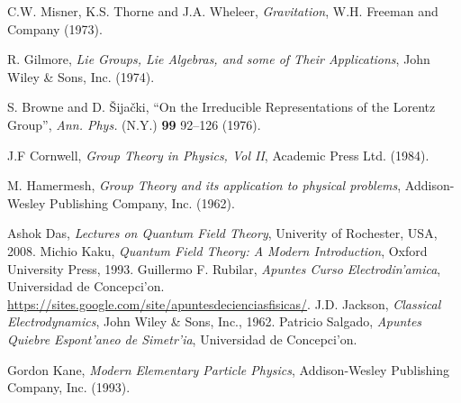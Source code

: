 \begin{thebibliography}{99}


  C.W. Misner, K.S. Thorne and J.A. Wheleer, \emph{Gravitation}, W.H. Freeman and Company (1973).

  R. Gilmore, \emph{Lie Groups, Lie Algebras, and some of
Their Applications}, John Wiley \& Sons, Inc. (1974).

  S. Browne and D. \v {S}ija\v {c}ki, ``On the Irreducible
Representations of the Lorentz Group'', \emph{Ann. Phys.} (N.Y.) \textbf{99}
92--126 (1976).

  J.F Cornwell, \emph{Group Theory in Physics, Vol II},
Academic Press Ltd. (1984).

  M. Hamermesh, \emph{Group Theory and its application to
physical problems}, Addison-Wesley Publishing Company, Inc. (1962).

 Ashok Das, \emph{Lectures on Quantum Field Theory}, Univerity of Rochester, USA, 2008.
 Michio Kaku, \emph{Quantum Field Theory: A Modern Introduction}, Oxford University Press, 1993.
 Guillermo F. Rubilar, \emph{Apuntes Curso Electrodin'amica}, Universidad de Concepci'on. \url{https://sites.google.com/site/apuntesdecienciasfisicas/}.
 J.D. Jackson, \emph{Classical Electrodynamics}, John Wiley \& Sons, Inc., 1962.
 Patricio Salgado, \emph{Apuntes Quiebre Espont'aneo de Simetr'ia}, Universidad de Concepci'on.

 Gordon Kane, \emph{Modern Elementary Particle Physics}, Addison-Wesley Publishing Company, Inc. (1993).

\end{thebibliography}